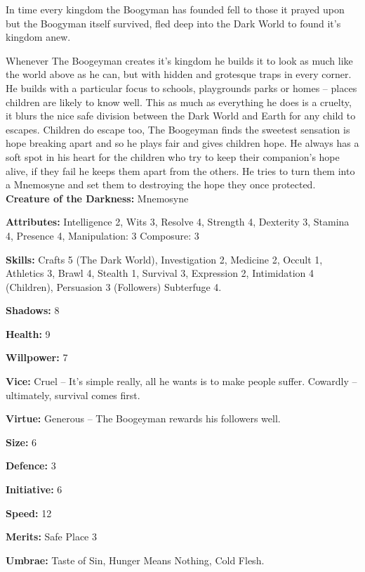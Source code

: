 In time every kingdom the Boogyman has founded fell to those it prayed upon but the Boogyman itself survived, fled deep into the Dark World to found it's kingdom anew.

Whenever The Boogeyman creates it's kingdom he builds it to look as much like the world above as he can, but with hidden and grotesque traps in every corner. He builds with a particular focus to schools, playgrounds parks or homes – places children are likely to know well. This as much as everything he does is a cruelty, it blurs the nice safe division between the Dark World and Earth for any child to escapes. Children do escape too, The Boogeyman finds the sweetest sensation is hope breaking apart and so he plays fair and gives children hope. He always has a soft spot in his heart for the children who try to keep their companion's hope alive, if they fail he keeps them apart from the others. He tries to turn them into a Mnemosyne and set them to destroying the hope they once protected.\\

\noindent \textbf{Creature of the Darkness:} Mnemosyne

\noindent \textbf{Attributes:} Intelligence 2, Wits 3, Resolve 4, Strength 4, Dexterity 3, Stamina 4, Presence 4, Manipulation: 3 Composure: 3

\noindent \textbf{Skills:} Crafts 5 (The Dark World), Investigation 2, Medicine 2, Occult 1, Athletics 3, Brawl 4, Stealth 1, Survival 3, Expression 2, Intimidation 4 (Children), Persuasion 3 (Followers) Subterfuge 4.

\noindent \textbf{Shadows:} 8

\noindent \textbf{Health:} 9 

\noindent \textbf{Willpower:} 7

\noindent \textbf{Vice:} Cruel – It's simple really, all he wants is to make people suffer. Cowardly – ultimately, survival comes first. 

\noindent \textbf{Virtue:} Generous – The Boogeyman rewards his followers well.

\noindent \textbf{Size:} 6

\noindent \textbf{Defence:} 3

\noindent \textbf{Initiative:} 6 

\noindent \textbf{Speed:} 12 

\noindent \textbf{Merits:} Safe Place 3

\noindent \textbf{Umbrae:} Taste of Sin, Hunger Means Nothing, Cold Flesh.

